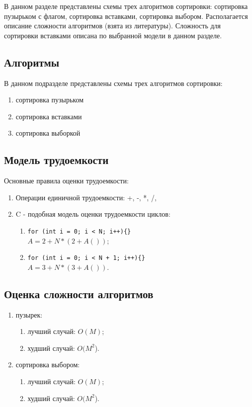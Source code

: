В данном разделе представлены схемы трех алгоритмов сортировки: сортировка пузырьком с флагом, сортировка вставками, сортировка выбором. Располагается описание сложности алгоритмов (взята из литературы). Сложность для сортировки вставками описана по выбранной модели в данном разделе.

\subsection{Алгоритмы}

	В данном подразделе представлены схемы трех алгоритмов сортировки:
	\begin{enumerate}[1)]
		\item сортировка пузырьком
		\item сортировка вставками
		\item сортировка выборкой
	\end{enumerate}

	

\subsection{Модель трудоемкости}
	
	Основные правила оценки трудоемкости:
	\begin{enumerate}
		\item Операции единичной трудоемкости: +, -, *, /, %
		\item C - подобная модель оценки трудоемкости циклов:
		\begin{enumerate}
			\item 
			\lstinline|for (int i = 0; i < N; i++){}| \\
			$ A = 2 + N * (2 + A()) $;
			\item
			\lstinline|for (int i = 0; i < N + 1; i++){}| \\
			$ A = 3 + N * (3 + A()) $.
			
		\end{enumerate}
	\end{enumerate}

\subsection{Оценка сложности алгоритмов}
	
	\begin{enumerate}[1)]
		\item пузырек:
		\begin{enumerate}
			\item лучший случай: $O(M)$;
			\item худший случай: $O(M^2$).
		\end{enumerate}
		
		\item сортировка выбором:
		
		\begin{enumerate}
			\item лучший случай: $O(M)$;
			\item худший случай: $O(M^2$).
		\end{enumerate}
	\end{enumerate}
	
	